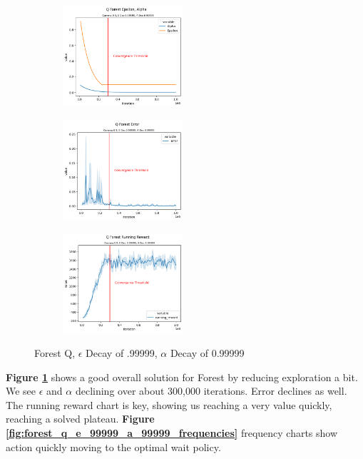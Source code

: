 \documentclass[letterpaper]{article} %
\begin{document}
\begin{figure}[!htb]
	\centering
 	\begin{subfigure}[b]{0.275\textwidth}
	\centering
		\includegraphics[width=1.75in]{Figures/Q_Forest_Epsilon__Alpha_Gamma_0_9__E_Dec_0_99999__A_Dec_0_99999.png}
  	\end{subfigure}%
	 \begin{subfigure}[b]{0.275\textwidth}
	 \centering
		\includegraphics[width=1.75in]{Figures/Q_Forest_Error_Gamma_0_9__E_Dec_0_99999__A_Dec_0_99999.png}
  	\end{subfigure}
	\begin{subfigure}[b]{0.5\textwidth}
		\centering
		\includegraphics[width=1.75in]{Figures/Q_Forest_Running_Reward_Gamma_0_9__E_Dec_0_99999__A_Dec_0_99999.png}
  	\end{subfigure}
\caption{Forest Q,  $\epsilon$ Decay of .99999, $\alpha$ Decay of 0.99999}
\label{fig:forest_q_e_99999_a_99999_rewards}
\end{figure}



\textbf{Figure \ref{fig:forest_q_e_99999_a_99999_rewards}} shows a good overall solution for Forest by reducing exploration a bit.  We see $\epsilon$ and $\alpha$ declining over about 300,000 iterations.  Error declines as well.  The running reward chart is key, showing us reaching a very value quickly, reaching a solved plateau.   \textbf{Figure \ref{fig:forest_q_e_99999_a_99999_frequencies}} frequency charts show action quickly moving to the optimal wait policy.
\end{document}
